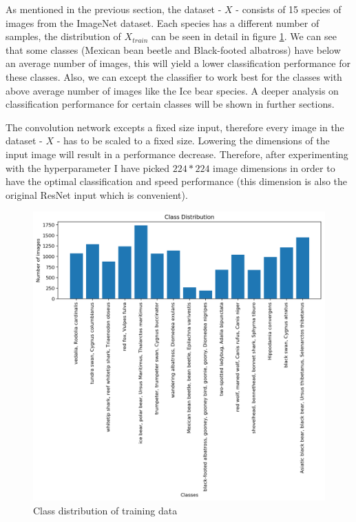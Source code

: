 \documentclass[times, utf8, diplomski]{fer}
\begin{document}
As mentioned in the previous section, the dataset - $X$ - consists of 15 species of images from the ImageNet dataset. Each species has a different number of samples, the distribution of $X_{train}$ can be seen in detail in figure \ref{fig:training_set_class_distributon}. We can see that some classes (Mexican bean beetle and Black-footed albatross) have below an average number of images, this will yield a lower classification performance for these classes. Also, we can except the classifier to work best for the classes with above average number of images like the Ice bear species. A deeper analysis on classification performance for certain classes will be shown in further sections.

The convolution network excepts a fixed size input, therefore every image in the dataset - $X$ - has to be scaled to a fixed size. Lowering the dimensions of the input image will result in a performance decrease. Therefore, after experimenting with the hyperparameter I have picked $224 * 224$ image dimensions in order to have the optimal classification and speed performance (this dimension is also the original ResNet input which is convenient).

\begin{figure}
  \includegraphics[scale=0.75]{figures/class_distribution.png}
  \centering
  \caption{Class distribution of training data}
  \label{fig:training_set_class_distributon}
\end{figure}
\end{document}
